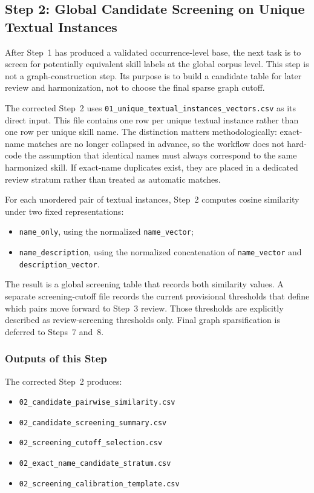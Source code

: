 \subsection{Step 2: Global Candidate Screening on Unique Textual Instances}
\label{sec:step2_global_similarity}

After Step~1 has produced a validated occurrence-level base, the next task is to screen for potentially equivalent skill labels at the global corpus level. This step is not a graph-construction step. Its purpose is to build a candidate table for later review and harmonization, not to choose the final sparse graph cutoff.

The corrected Step~2 uses \texttt{01\_unique\_textual\_instances\_vectors.csv} as its direct input. This file contains one row per unique textual instance rather than one row per unique skill name. The distinction matters methodologically: exact-name matches are no longer collapsed in advance, so the workflow does not hard-code the assumption that identical names must always correspond to the same harmonized skill. If exact-name duplicates exist, they are placed in a dedicated review stratum rather than treated as automatic matches.

For each unordered pair of textual instances, Step~2 computes cosine similarity under two fixed representations:
\begin{itemize}
    \item \texttt{name\_only}, using the normalized \texttt{name\_vector};
    \item \texttt{name\_description}, using the normalized concatenation of \texttt{name\_vector} and \texttt{description\_vector}.
\end{itemize}

The result is a global screening table that records both similarity values. A separate screening-cutoff file records the current provisional thresholds that define which pairs move forward to Step~3 review. Those thresholds are explicitly described as review-screening thresholds only. Final graph sparsification is deferred to Steps~7 and~8.

\subsubsection{Outputs of this Step}
\label{sec:step2_outputs}

The corrected Step~2 produces:
\begin{itemize}
    \item \texttt{02\_candidate\_pairwise\_similarity.csv}
    \item \texttt{02\_candidate\_screening\_summary.csv}
    \item \texttt{02\_screening\_cutoff\_selection.csv}
    \item \texttt{02\_exact\_name\_candidate\_stratum.csv}
    \item \texttt{02\_screening\_calibration\_template.csv}
\end{itemize}

